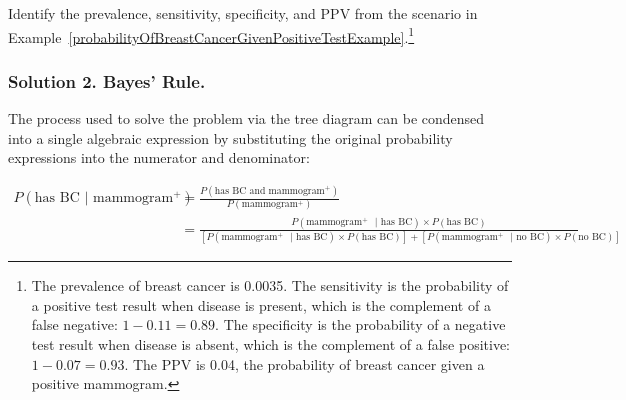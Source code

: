 \begin{exercise}
	Identify the prevalence, sensitivity, specificity, and PPV from the scenario in Example~\ref{probabilityOfBreastCancerGivenPositiveTestExample}.\footnote{The prevalence of breast cancer is 0.0035. The sensitivity is the probability of a positive test result when disease is present, which is the complement of a false negative: $1 - 0.11 = 0.89$. The specificity is the probability of a negative test result when disease is absent, which is the complement of a false positive: $1 - 0.07 = 0.93$. The PPV is 0.04, the probability of breast cancer given a positive mammogram.}
\end{exercise}

\subsubsection{Solution 2. Bayes' Rule.}

The process used to solve the problem via the tree diagram can be condensed into a single algebraic expression by substituting the original probability expressions into the numerator and denominator:

\begin{small}
\begin{align*}
P(\text{has BC } | \text{ mammogram$^+$})
&= \frac{P(\text{has BC and mammogram$^+$})}{P(\text{mammogram$^+$})} \\
&= \frac{P(\text{mammogram$^+$ } | \text{ has BC}) \times P(\text{has BC})}
{[P(\text{mammogram$^+$ } | \text{ has BC}) \times P(\text{has BC})] + [P(\text{mammogram$^+$ } | \text{ no BC}) \times P(\text{no BC})]}
\end{align*}
\end{small}

